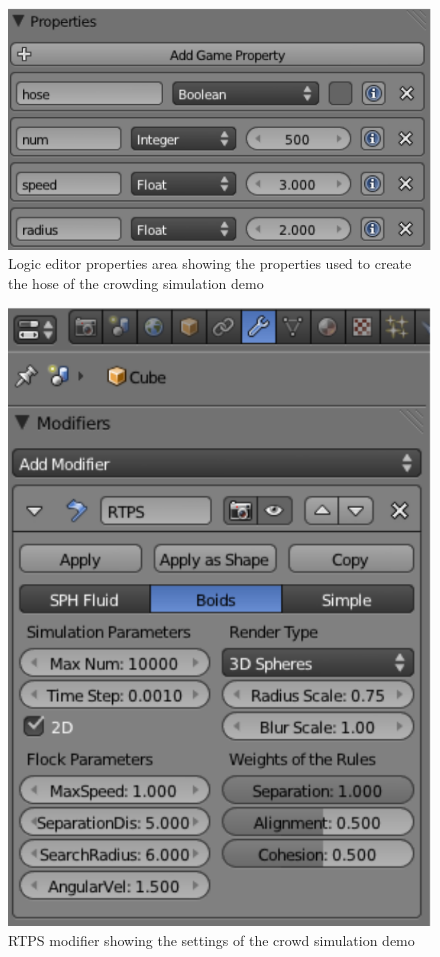 \begin{figure}[htbp]
\begin{center}
\includegraphics[scale=0.7]{figures/demo_crowds_prop.pdf}
\caption{Logic editor properties area showing the properties used to create the hose of the crowding simulation demo}
\label{crowd_prop}
\end{center}
\end{figure}

\begin{figure}[htbp]
\begin{center}
\includegraphics[scale=0.8]{figures/demo_crowds_modifier.pdf}
\caption{RTPS modifier showing the settings of the crowd simulation demo}
\label{crowd_modifier}
\end{center}
\end{figure}


